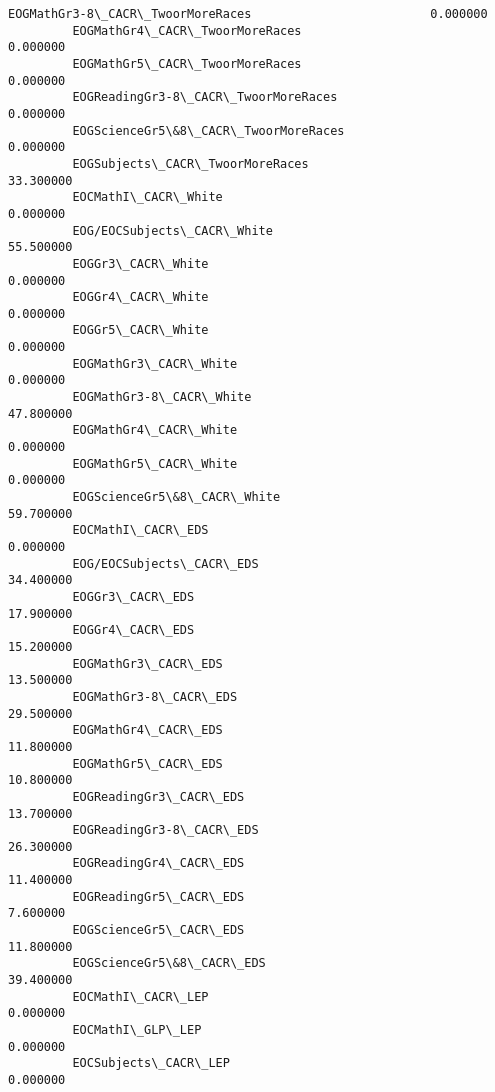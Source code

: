 \documentclass[11pt]{article}
\begin{document}
\begin{Verbatim}[commandchars=\\\{\}]
         EOGMathGr3-8\_CACR\_TwoorMoreRaces                         0.000000   
         EOGMathGr4\_CACR\_TwoorMoreRaces                           0.000000   
         EOGMathGr5\_CACR\_TwoorMoreRaces                           0.000000   
         EOGReadingGr3-8\_CACR\_TwoorMoreRaces                      0.000000   
         EOGScienceGr5\&8\_CACR\_TwoorMoreRaces                      0.000000   
         EOGSubjects\_CACR\_TwoorMoreRaces                         33.300000   
         EOCMathI\_CACR\_White                                      0.000000   
         EOG/EOCSubjects\_CACR\_White                              55.500000   
         EOGGr3\_CACR\_White                                        0.000000   
         EOGGr4\_CACR\_White                                        0.000000   
         EOGGr5\_CACR\_White                                        0.000000   
         EOGMathGr3\_CACR\_White                                    0.000000   
         EOGMathGr3-8\_CACR\_White                                 47.800000   
         EOGMathGr4\_CACR\_White                                    0.000000   
         EOGMathGr5\_CACR\_White                                    0.000000   
         EOGScienceGr5\&8\_CACR\_White                              59.700000   
         EOCMathI\_CACR\_EDS                                        0.000000   
         EOG/EOCSubjects\_CACR\_EDS                                34.400000   
         EOGGr3\_CACR\_EDS                                         17.900000   
         EOGGr4\_CACR\_EDS                                         15.200000   
         EOGMathGr3\_CACR\_EDS                                     13.500000   
         EOGMathGr3-8\_CACR\_EDS                                   29.500000   
         EOGMathGr4\_CACR\_EDS                                     11.800000   
         EOGMathGr5\_CACR\_EDS                                     10.800000   
         EOGReadingGr3\_CACR\_EDS                                  13.700000   
         EOGReadingGr3-8\_CACR\_EDS                                26.300000   
         EOGReadingGr4\_CACR\_EDS                                  11.400000   
         EOGReadingGr5\_CACR\_EDS                                   7.600000   
         EOGScienceGr5\_CACR\_EDS                                  11.800000   
         EOGScienceGr5\&8\_CACR\_EDS                                39.400000   
         EOCMathI\_CACR\_LEP                                        0.000000   
         EOCMathI\_GLP\_LEP                                         0.000000   
         EOCSubjects\_CACR\_LEP                                     0.000000   

\end{Verbatim}
\end{document}
